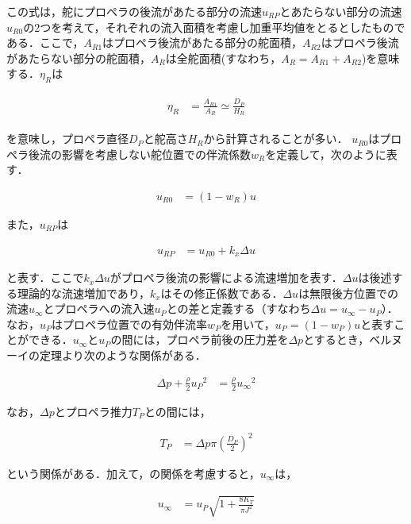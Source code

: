 この式は，舵にプロペラの後流があたる部分の流速$u_{RP}$とあたらない部分の流速$u_{R0}$の2つを考えて，それぞれの流入面積を考慮し加重平均値をとるとしたものである．ここで，$A_{R1}$はプロペラ後流があたる部分の舵面積，$A_{R2}$はプロペラ後流があたらない部分の舵面積，$A_R$は全舵面積(すなわち，$A_R=A_{R1}+A_{R2}$)を意味する．$\eta_R$は

\begin{align}
    \begin{split}
        \eta_R &= \frac{A_{R1}}{A_R} \simeq \frac{D_P}{H_R} \label{eq:2-40}
    \end{split}
\end{align}

を意味し，プロペラ直径$D_P$と舵高さ$H_R$から計算されることが多い．
$u_{R0}$はプロペラ後流の影響を考慮しない舵位置での伴流係数$w_R$を定義して，次のように表す．

\begin{align}
    u_{R0} &= (1-w_R) u \label{eq:2-41}
\end{align}

また，$u_{RP}$は

\begin{align}
    u_{RP} &= u_{R0} + k_x \Delta u \label{eq:2-42}
\end{align}

と表す．ここで$k_x \Delta u$がプロペラ後流の影響による流速増加を表す．$\Delta u$は後述する理論的な流速増加であり，$k_x$はその修正係数である．$\Delta u$は無限後方位置での流速$u_\infty$とプロペラへの流入速$u_P$との差と定義する（すなわち$\Delta u = u_\infty-u_P$）．なお，$u_P$はプロペラ位置での有効伴流率$w_P$を用いて，$u_P=(1-w_P )u$と表すことができる．$u_\infty$と$u_P$の間には，プロペラ前後の圧力差を$\Delta p$とするとき，ベルヌーイの定理より次のような関係がある．

\begin{align}
    \Delta p + \frac{\rho}{2} {u_P}^{2} &= \frac{\rho}{2} {u_\infty}^{2} \label{eq:2-43}
\end{align}

なお，$\Delta p$とプロペラ推力$T_P$との間には，

\begin{align}
    T_P &= \Delta p \pi (\frac{D_P}{2})^2 \label{eq:2-44}
\end{align}

という関係がある．加えて，の関係を考慮すると，$u_\infty$は，

\begin{align}
    u_\infty &= u_P \sqrt{1+\frac{8 K_T}{\pi J^2}} \label{eq:2-45}
\end{align}

